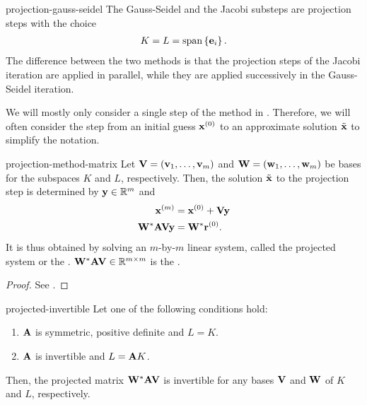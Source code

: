 \begin{Example}{projection-gauss-seidel}
  The Gauss-Seidel and the Jacobi substeps are projection steps with the choice
  \begin{gather}
    K=L=\operatorname{span}\left\{\mathbf e_i\right\}.
  \end{gather}
  The difference between the two methods is that the projection steps
  of the Jacobi iteration are applied in parallel, while they are
  applied successively in the Gauss-Seidel iteration.
\end{Example}

\begin{notation}
  We will mostly only consider a single step of the method in
  . Therefore, we will often consider
  the step from an initial guess $\mathbf x^{(0)}$ to an approximate solution
  $\tilde {\mathbf x}$ to simplify the notation.
\end{notation}

\begin{Definition}{projection-method-matrix}
  Let $\mathbf V=(\mathbf v_1,\dots,\mathbf v_m)$ and $\mathbf W=(\mathbf w_1,\dots,\mathbf w_m)$ be bases for
  the subspaces $K$ and $L$, respectively. Then, the solution
  $\tilde {\mathbf x}$ to the projection step is determined by $\mathbf y\in\mathbb R^m$ and
  \begin{align}
    \mathbf x^{(m)} &= \mathbf x^{(0)} + \mathbf V\mathbf y\\
    \mathbf W^*\mathbf A\mathbf V \mathbf y &= \mathbf W^* \mathbf r^{(0)}.
  \end{align}
  It is thus obtained by solving an $m$-by-$m$ linear system, called
  the projected system or the . $\mathbf W^*\mathbf A\mathbf V\in\mathbb R^{m\times m}$ is the
  .
\end{Definition}

\begin{proof}
  See \cite[Section 5.1.2]{Saad00}.
\end{proof}

\begin{Theorem}{projected-invertible}
  Let one of the following conditions hold:
  \begin{enumerate}
  \item $\mathbf A$ is symmetric, positive definite and $L=K$.
  \item $\mathbf A$ is invertible and $L = \mathbf A K$.
  \end{enumerate}
  Then, the projected matrix $\mathbf W^*\mathbf A\mathbf V$ is invertible for any
  bases $\mathbf V$ and $\mathbf W$ of $K$ and $L$, respectively.
\end{Theorem}

